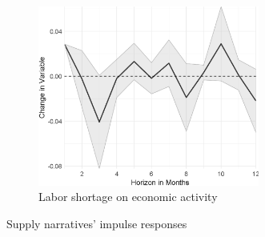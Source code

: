 \begin{figure}
\begin{subfigure}{00.24\textwidth}
		\includegraphics[width=0.8\textwidth]{output/lp/baseline/bHP/labor_shortage/labor_shortageoneconac_djn.eps}
		\caption{Labor shortage on economic activity}
	\end{subfigure}
	\caption{Supply narratives' impulse responses}
	\label{fig:irf_2}
\end{figure}
